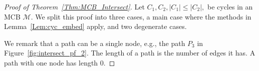 \documentclass[fleqn,11pt]{article}
\newcommand\calM{\mathcal{M}}
\begin{document}

\begin{proof}[Proof of Theorem~\ref{Thm:MCB_Intersect}]
	Let $C_1,C_2,|C_1|\le|C_2|,$ be cycles in an MCB $\calM$. 
	We split this proof into three cases, a main case where the methods in Lemma~\ref{Lem:cyc_embed} apply, and two degenerate cases.
	
	We remark that a path can be a single node, e.g., the path $P_3$ in Figure~\ref{fig:intersect_pf_2}. 
	The length of a path is the number of edges it has. A path with one node has length 0.
	
	
	
	
	

\end{proof}
\end{document}
